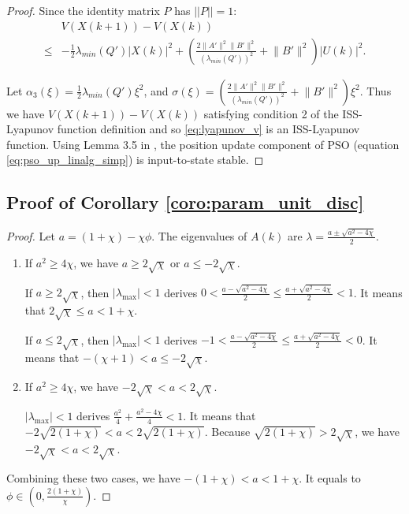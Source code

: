 \documentclass{sig-alternate}
\begin{document}
\begin{proof}
Since the identity matrix $ P $ has $ || P || = 1 $:
\begin{equation}
\label{eq:lyapunov_delta5}
\begin{aligned}
& V( X(k+1) ) - V( X(k) ) \\
	\leq & - \frac{1}{2} \lambda_{min}(Q') | X(k) |^{2} + \left( \frac{2 \lVert A' \rVert^{2} \lVert B' \rVert^{2}}{ ( \lambda_{min}(Q') )^{2} } + \lVert B' \rVert^{2} \right) | U(k) |^{2}.
\end{aligned}
\end{equation}
		
Let
$ \alpha_{3} ( \xi )= \frac{1}{2} \lambda_{min}(Q') \xi^{2} $, and
$ \sigma ( \xi ) = \left( \frac{2 \lVert A' \rVert^{2} \lVert B' \rVert^{2}}{ ( \lambda_{min}(Q') )^{2} } +  \lVert B' \rVert^{2} \right) \xi^{2} $.
Thus we have $  V( X(k+1) ) - V( X(k) ) $ satisfying condition 2 of the ISS-Lyapunov function definition and
so \eqref{eq:lyapunov_v} is an ISS-Lyapunov function.
Using Lemma 3.5 in \cite{Jiang2001857}, the position update component of PSO (equation \eqref{eq:pso_up_linalg_simp}) is input-to-state stable.
\end{proof}

\subsection{Proof of Corollary \ref{coro:param_unit_disc}}
\label{sec:coro:param_unit_disc:proof}

\begin{proof}
Let $ a = (1 + \chi) - \chi \phi $. 
The eigenvalues of $ A(k) $ are
$ \lambda = \frac{ a \pm \sqrt{ a^{2} - 4 \chi } }{2} $.
		
\begin{enumerate}
\item If $ a^{2} \geq 4 \chi $, we have $ a \geq 2 \sqrt{\chi} $ or $ a \leq - 2 \sqrt{\chi} $.
			
If $ a \geq 2 \sqrt{\chi} $, then $ | \lambda_{\max} | < 1 $ derives $ 0 < \frac{a-\sqrt{a^{2}-4\chi}}{2} \leq \frac{a+\sqrt{a^{2}-4\chi}}{2} < 1 $.
It means that $ 2 \sqrt{ \chi } \leq a < 1 + \chi $.
			
If $ a \leq 2 \sqrt{\chi} $, then $ | \lambda_{\max} | < 1 $ derives $ -1 < \frac{a-\sqrt{a^{2}-4\chi}}{2} \leq \frac{a+\sqrt{a^{2}-4\chi}}{2} < 0 $.
It means that $ - (\chi+1) < a \leq - 2 \sqrt{\chi} $.
			
\item If $ a^{2} \geq 4 \chi $, we have $ - 2 \sqrt{\chi} < a < 2 \sqrt{\chi} $.
			
$ | \lambda_{\max} | < 1 $ derives $ \frac{ a^{2} }{4} + \frac{ a^{2} - 4\chi }{4} < 1 $.
It means that $ - 2 \sqrt{ 2(1+\chi) } < a < 2 \sqrt{ 2(1+\chi) } $.
Because $ \sqrt{ 2(1+\chi) } > 2 \sqrt{ \chi } $, we have $ - 2 \sqrt{\chi} < a < 2 \sqrt{\chi} $.
\end{enumerate}
Combining these two cases, we have  $ - (1 + \chi) < a < 1 + \chi $.
It equals to $ \phi \in (0 , \frac{2(1+\chi)}{\chi} ) $.
		
\end{proof}		
		


\end{document}
